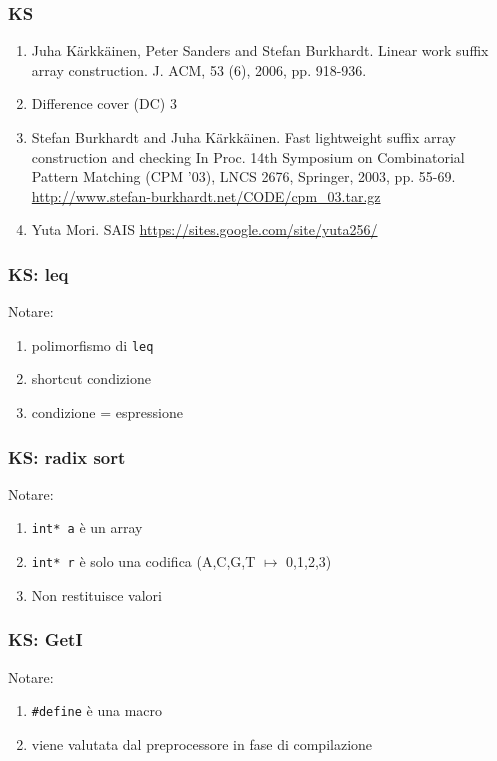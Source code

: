 \begin{frame}
\frametitle{KS}
\begin{enumerate}
\item
Juha Kärkkäinen, Peter Sanders and Stefan Burkhardt.
Linear work suffix array construction. J. ACM, 53 (6), 2006, pp. 918-936.
\item
Difference cover (DC) 3
\item
Stefan Burkhardt and Juha Kärkkäinen.
Fast lightweight suffix array construction and checking
In Proc. 14th Symposium on Combinatorial Pattern Matching (CPM '03), LNCS 2676,
Springer, 2003, pp. 55-69. \url{http://www.stefan-burkhardt.net/CODE/cpm_03.tar.gz}
\item
Yuta Mori.
SAIS \url{https://sites.google.com/site/yuta256/}
\end{enumerate}
\end{frame}


\begin{frame}[fragile]
\frametitle{KS: leq}

\begin{block}{Notare:}
\begin{enumerate}
\item
polimorfismo di \lstinline!leq!
\item
shortcut condizione
\item
condizione = espressione
\end{enumerate}
\end{block}
\end{frame}

\begin{frame}[fragile]
\frametitle{KS: radix sort}

\begin{block}{Notare:}
\begin{enumerate}
\item
\lstinline!int* a! è un array
\item
\lstinline!int* r! è solo una codifica (A,C,G,T $\mapsto$ 0,1,2,3)
\item
Non restituisce valori
\end{enumerate}
\end{block}
\end{frame}


\begin{frame}[fragile]
\frametitle{KS: GetI}

\begin{block}{Notare:}
\begin{enumerate}
\item
\lstinline!#define! è una macro
\item
viene valutata dal preprocessore in fase di compilazione
\end{enumerate}
\end{block}
\end{frame}

